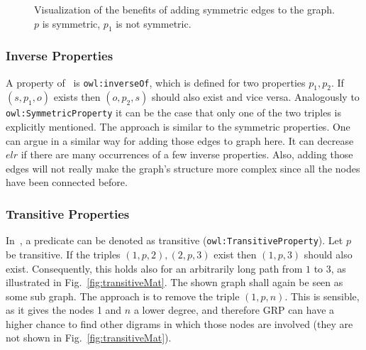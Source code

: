 \begin{figure}[h]
	\centering
	\hfill
	\caption{Visualization of the benefits of adding symmetric edges to the graph. $p$ is symmetric, $p_1$ is not symmetric.}
	\label{}
\end{figure}

\subsubsection{Inverse Properties}

A property of~\cite{owl} is {\tt owl:inverseOf}, which is defined for two properties $p_1, p_2$. If $(s,p_1,o)$ exists then $(o,p_2,s)$ should also exist and vice versa. Analogously to {\tt owl:SymmetricProperty} it can be the case that only one of the two triples is explicitly mentioned. The approach is similar to the symmetric properties. One can argue in a similar way for adding those edges to graph here. It can decrease $elr$ if there are many occurrences of a few inverse properties. Also, adding those edges will not really make the graph's structure more complex since all the nodes have been connected before.


\subsubsection{Transitive Properties}

In~\cite{owl}, a predicate can be denoted as transitive ({\tt owl:TransitiveProperty}). Let $p$ be transitive. If the triples $(1,p,2),(2,p,3)$ exist then $(1,p,3)$ should also exist. Consequently, this holds also for an arbitrarily long path from $1$ to $3$, as illustrated in Fig.~\ref{fig:transitiveMat}. The shown graph shall again be seen as some sub graph. The approach is to remove the triple $(1,p,n)$. This is sensible, as it gives the nodes 1 and $n$ a lower degree, and therefore GRP can have a higher chance to find other digrams in which those nodes are involved (they are not shown in Fig.~\ref{fig:transitiveMat}).

